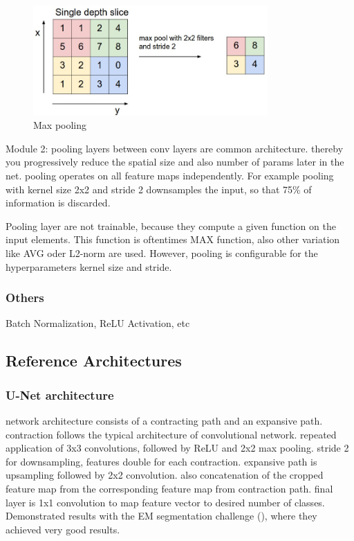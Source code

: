 \begin{figure}[h]
    \centering
    \includegraphics[width=0.8\textwidth]{images/maxpool}
    \caption{Max pooling \cite{stanford_convnet}}
    \label{fig:pooling}
\end{figure}

\cite{stanford_convnet}
Module 2: pooling layers between conv layers are common architecture. thereby you progressively reduce the spatial size and also number of params later in the net. pooling operates on all feature maps independently. For example pooling with kernel size 2x2 and stride 2 downsamples the input, so that 75\% of information is discarded.

Pooling layer are not trainable, because they compute a given function on the input elements. This function is oftentimes MAX function, also other variation like AVG oder L2-norm are used. However, pooling is configurable for the hyperparameters kernel size and stride.

\subsubsection{Others}
Batch Normalization, ReLU Activation, etc

\subsection{Reference Architectures}

\subsubsection{U-Net architecture}
\cite{unet15}
network architecture consists of a contracting path and an expansive path. contraction follows the typical architecture of convolutional network. repeated application of 3x3 convolutions, followed by ReLU and 2x2 max pooling. stride 2 for downsampling, features double for each contraction.
expansive path is upsampling followed by 2x2 convolution. also concatenation of the cropped feature map from the corresponding feature map from contraction path.
final layer is 1x1 convolution to map feature vector to desired number of classes. Demonstrated results with the EM segmentation challenge (\cite{isbi_challenge}), where they achieved very good results.


